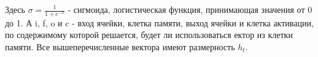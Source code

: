 Здесь $\sigma = \frac{1}{1+e^{-x}} $ - сигмоида, логистическая функция, принимающая значения от 0 до 1. А i, f, o и c - вход ячейки, клетка памяти, выход ячейки и клетка активации, по содержимому которой решается, будет ли использоваться ектор из клетки памяти. Все вышеперечисленные вектора имеют размерность $h_t$.